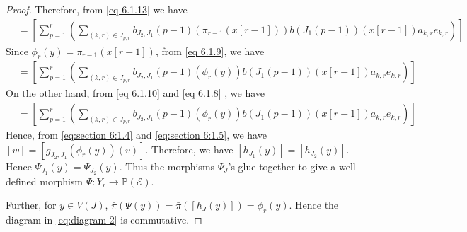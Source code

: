 \documentclass[12pt,reqno]{amsart}
\numberwithin{equation}{section}
\theoremstyle{definition}
\begin{document}
\begin{proof}
Therefore, from \cref{eq 6.1.13} we have \begin{align}
			[w]&=[\sum_{p=1}^{r}(\sum_{(k,r)\in J_{p,r}}b_{J_{2},J_{1}}(p-1)(\pi_{r-1}(x[r-1]))b(J_{1}(p-1))(x[r-1])a_{k,r}e_{k,r})]\label{eq 6.1.9}	
		\end{align}
		Since  $\phi_{r}(y)=\pi_{r-1}(x[r-1])$, from \cref{eq 6.1.9}, we have
		\begin{align}
			[w]&=[\sum_{p=1}^{r}(\sum_{(k,r)\in J_{p,r}}b_{J_{2},J_{1}}(p-1)(\phi_{r}(y))b(J_{1}(p-1))(x[r-1])a_{k,r}e_{k,r})]\label{eq:section 6:1.4}\end{align}
	On the other hand, from \cref{eq 6.1.10} and \cref{eq 6.1.8} , we have 
		\begin{align}
			[g_{J_{2},J_{1}}(\phi_{r}(y))(v)]&=[\sum_{p=1}^{r}(\sum_{(k,r)\in J_{p,r}}b_{J_{2},J_{1}}(p-1)(\phi_{r}(y))b(J_{1}(p-1))(x[r-1])a_{k,r}e_{k,r})]\label{eq:section 6:1.5}
		\end{align}	
Hence, from \cref{eq:section 6:1.4} and \cref{eq:section 6:1.5}, we have $[w]=[g_{J_{2},J_{1}}(\phi_{r}(y))(v)]$.
		Therefore, we have $[h_{J_{1}}(y)]=[h_{J_{2}}(y)]$. Hence $\Psi_{J_{1}}(y)=\Psi_{J_{2}}(y)$. Thus the morphisms $\Psi_{J}$'s glue together to give a well defined morphism $\Psi:Y_{r}\longrightarrow\mathbb{P}(\mathcal{E})$. 
		
		Further, for $y\in V(J)$, $\bar{\pi}(\Psi(y))=\bar{\pi}([h_{J}(y)])=\phi_{r}(y)$. Hence the diagram in \cref{eq:diagram 2} is commutative. 
		

\end{proof}
\end{document}

